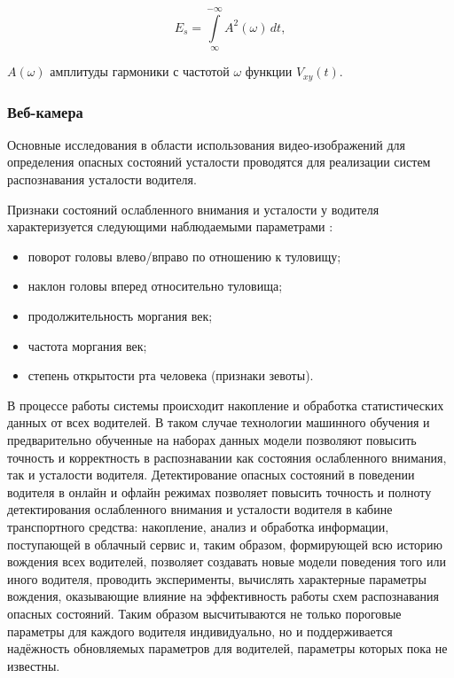 \begin{equation}
\label{eq:normir}
E_s = \int\limits_{\infty}^{-\infty} A^2(\omega)\,dt,
\end{equation}

\begin{eqexpl}[15mm]
\item{$A(\omega)$} амплитуды гармоники с частотой $\omega$ функции $V_{xy}(t)$.
\end{eqexpl}

\subsubsection{Веб-камера}
Основные исследования в области использования видео-изображений для определения опасных состояний усталости проводятся для реализации систем распознавания усталости водителя.

Признаки состояний ослабленного внимания и усталости у водителя характеризуется следующими наблюдаемыми параметрами \cite{videoMethod}:
\begin{itemize}[leftmargin=1.6\parindent]
\item поворот головы влево/вправо по отношению к туловищу;
\item наклон головы вперед относительно туловища;
\item продолжительность моргания век;
\item частота моргания век;
\item степень открытости рта человека (признаки зевоты).
\end{itemize}

В процессе работы системы происходит накопление и обработка статистических данных от всех водителей. В таком случае технологии машинного обучения и предварительно обученные на наборах данных модели позволяют повысить точность и корректность в распознавании как состояния ослабленного внимания, так и усталости водителя. Детектирование опасных состояний в поведении водителя в онлайн и офлайн режимах позволяет повысить точность и полноту детектирования ослабленного внимания и усталости водителя в кабине транспортного средства: накопление, анализ и обработка информации, поступающей в облачный сервис и, таким образом, формирующей всю историю вождения всех водителей, позволяет создавать новые модели поведения того или иного водителя, проводить эксперименты, вычислять характерные параметры вождения, оказывающие влияние на эффективность работы схем распознавания опасных состояний. Таким образом высчитываются не только пороговые параметры для каждого водителя индивидуально, но и поддерживается надёжность обновляемых параметров для водителей, параметры которых пока не известны. \cite{videoMethod}

